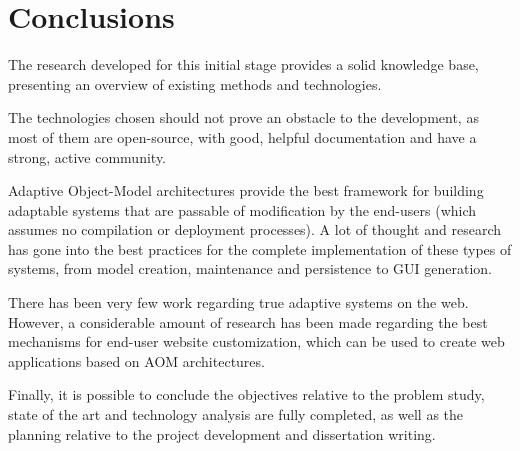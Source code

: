 \chapter{Conclusions}\label{chap:conclusions}

The research developed for this initial stage provides a solid knowledge base, presenting an overview of existing methods and technologies.

The technologies chosen should not prove an obstacle to the development, as most of them are open-source, with good, helpful documentation and have a strong, active community.

Adaptive Object-Model architectures provide the best framework for building adaptable systems that are passable of modification by the end-users (which assumes no compilation or deployment processes). A lot of thought and research has gone into the best practices for the complete implementation of these types of systems, from model creation, maintenance and persistence to GUI generation.

There has been very few work regarding true adaptive systems on the web. However, a considerable amount of research has been made regarding the best mechanisms for end-user website customization, which can be used to create web applications based on AOM architectures. 

Finally, it is possible to conclude the objectives relative to the problem study, state of the art and technology analysis are fully completed, as well as the planning relative to the project development and dissertation writing.

